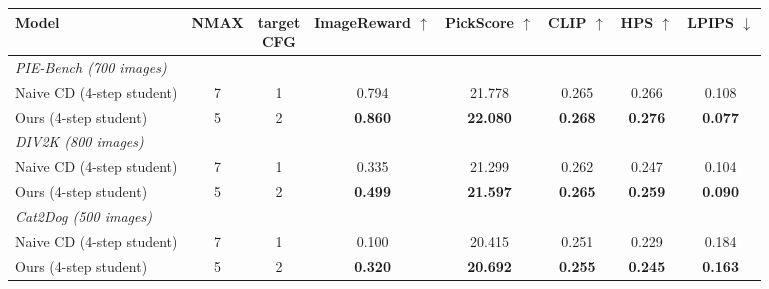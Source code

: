 \begin{tabular}{l c c c c c c c}
\toprule
Model & NMAX & \shortstack{target\\CFG} & \shortstack{ImageReward\\$\uparrow$} & \shortstack{PickScore\\$\uparrow$} & \shortstack{CLIP\\$\uparrow$} & \shortstack{HPS\\$\uparrow$} & \shortstack{LPIPS\\$\downarrow$} \\
\midrule
\multicolumn{8}{l}{\emph{PIE-Bench (700 images)}} \\
Naive CD (4-step student) & 7 & 1 & 0.794 & 21.778 & 0.265 & 0.266 & 0.108 \\
Ours (4-step student) & 5 & 2 & \textbf{0.860} & \textbf{22.080} & \textbf{0.268} & \textbf{0.276} & \textbf{0.077} \\
\midrule
\multicolumn{8}{l}{\emph{DIV2K (800 images)}} \\
Naive CD (4-step student) & 7 & 1 & 0.335 & 21.299 & 0.262 & 0.247 & 0.104 \\
Ours (4-step student) & 5 & 2 & \textbf{0.499} & \textbf{21.597} & \textbf{0.265} & \textbf{0.259} & \textbf{0.090} \\
\midrule
\multicolumn{8}{l}{\emph{Cat2Dog (500 images)}} \\
Naive CD (4-step student) & 7 & 1 & 0.100 & 20.415 & 0.251 & 0.229 & 0.184 \\
Ours (4-step student) & 5 & 2 & \textbf{0.320} & \textbf{20.692} & \textbf{0.255} & \textbf{0.245} & \textbf{0.163} \\
\bottomrule
\end{tabular}

